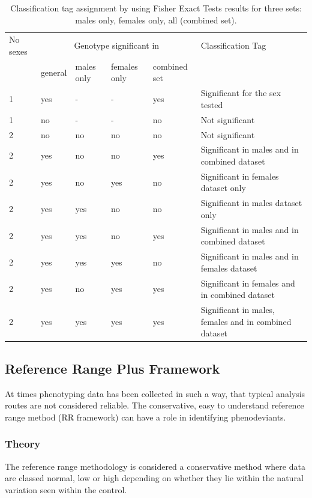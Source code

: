 \documentclass[12pt,a4paper]{article}
\begin{document}
\begin{table}[H]
\begin{center}
\begin{tabular}{| p{8mm} | p{13mm} | p{10mm} | p{13mm} | p{15mm} | p{7cm} |}
  \hline
No sexes& \multicolumn{4}{c}{Genotype significant in }&Classification Tag\\
&general&males only&females only&combined set&\\

\hline
1&yes&-&-&yes&Significant for the sex tested\\
1&no&-&-&no&Not significant\\
2&no&no&no&no&Not significant\\
2&yes&no&no&yes&Significant in males and in combined dataset\\
2&yes&no&yes&no&Significant in females dataset only\\
2&yes&yes&no&no&Significant in males dataset only\\
2&yes&yes&no&yes&Significant in males and in combined dataset\\
2&yes&yes&yes&no&Significant in males and in females dataset\\
2&yes&no&yes&yes&Significant in females and in combined dataset\\
2&yes&yes&yes&yes&Significant in males, females and in combined dataset\\
\hline  
\end{tabular}
\caption{Classification tag assignment by using Fisher Exact Tests results for three sets: males only, females only, all (combined set).}\label{table:06}
\end{center}
\end{table}

\subsection{Reference Range Plus Framework}
At times phenotyping data has been collected in such a way, that typical analysis routes are not considered reliable. The conservative, easy to understand reference range method (RR framework) can have a role in identifying phenodeviants.   
\subsubsection{Theory}
The reference range methodology is considered a conservative method where data are classed normal, low or high depending on whether they lie within the natural variation seen within the control. 
\end{document}
